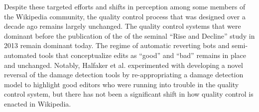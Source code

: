 Despite these targeted efforts and shifts in perception among some members of the Wikipedia community, the quality control process that was designed over a decade ago remains largely unchanged\cite{halfaker2014snuggle}.  The quality control systems that were dominant before the publication of the of the seminal ``Rise and Decline'' study in 2013\cite{halfaker2013rise} remain dominant today.  The regime of automatic reverting bots and semi-automated tools that conceptualize edits as ``good'' and ``bad'' remains in place and unchanged.  Notably, Halfaker et al. experimented with developing a novel reversal of the damage detection tools by re-appropriating a damage detection model to highlight good editors who were running into trouble in the quality control system\cite{halfaker2014snuggle}, but there has not been a significant shift in how quality control is enacted in Wikipedia.
